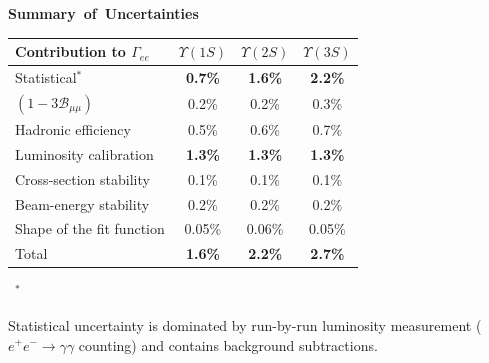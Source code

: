 \documentclass[landscape]{article}
\newenvironment{slide}[1][ ]{\mbox{\bf #1 } \vfill}{\vfill \mbox{ } \pagebreak}
\begin{document}


\begin{slide}[Summary of Uncertainties]
  \begin{center}
    \renewcommand{\arraystretch}{1.25}
    \begin{tabular}{l c c c}
      Contribution to $\Gamma_{ee}$ & \mbox{\hspace{1 cm}} $\Upsilon(1S)$ \mbox{\hspace{1 cm}} & \mbox{\hspace{1 cm}} $\Upsilon(2S)$ \mbox{\hspace{1 cm}} & \mbox{\hspace{1 cm}} $\Upsilon(3S)$ \mbox{\hspace{1 cm}} \\\hline
      Statistical$^*$               & {\bf 0.7\%}  & {\bf 1.6\%}  & {\bf 2.2\%} \\
      $(1 - 3\mathcal{B}_{\mu\mu})$ & 0.2\%  & 0.2\%  & 0.3\% \\
      Hadronic efficiency           & 0.5\%  & 0.6\%  & 0.7\% \\
      Luminosity calibration        & {\bf 1.3\%}  & {\bf 1.3\%}  & {\bf 1.3\%} \\
      Cross-section stability       & 0.1\%  & 0.1\%  & 0.1\% \\
      Beam-energy stability         & 0.2\%  & 0.2\%  & 0.2\% \\
      Shape of the fit function     & 0.05\% & 0.06\% & 0.05\% \\\hline
      Total                         & {\bf 1.6\%}  & {\bf 2.2\%}  & {\bf 2.7\%} \\
    \end{tabular}
  \end{center}

  \vspace{1 cm}
  \mbox{ }$^*$\begin{minipage}{0.9\linewidth}

    \vspace{1 cm}
    Statistical uncertainty is dominated by run-by-run luminosity
    measurement ($e^+e^- \to \gamma\gamma$ counting) and contains
    background subtractions.
  \end{minipage}
\end{slide}
\end{document}
